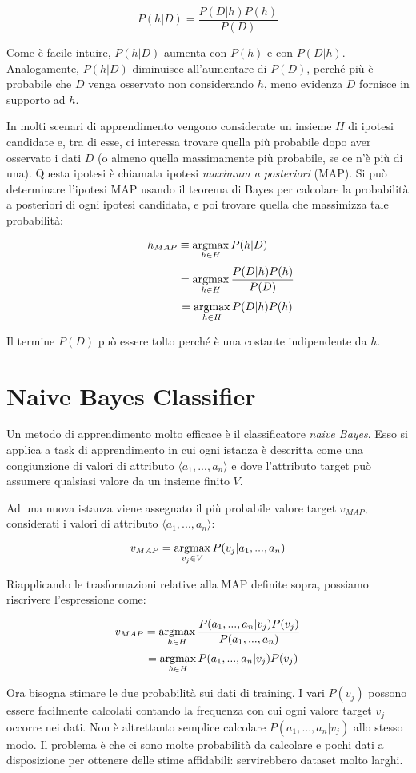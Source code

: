 $$ P(h|D) = \frac{P(D|h) P(h)}{P(D)} $$

Come è facile intuire, $P(h|D)$ aumenta con $P(h)$ e con $P(D|h)$. Analogamente, $P(h|D)$ diminuisce all'aumentare di $P(D)$, perché più è probabile che $D$ venga osservato non considerando $h$, meno evidenza $D$ fornisce in supporto ad $h$.

In molti scenari di apprendimento vengono considerate un insieme $H$ di ipotesi candidate e, tra di esse, ci interessa trovare quella più probabile dopo aver osservato i dati $D$ (o almeno quella massimamente più probabile, se ce n'è più di una). Questa ipotesi è chiamata ipotesi \emph{maximum a posteriori} (MAP). Si può determinare l'ipotesi MAP usando il teorema di Bayes per calcolare la probabilità a posteriori di ogni ipotesi candidata, e poi trovare quella che massimizza tale probabilità:

$$h_{MAP} \equiv \operatorname*{argmax}_{h \in H} P(h|D) $$
$$\hphantom{1111111111} = \operatorname*{argmax}_{h \in H} \frac{P(D|h) P(h)}{P(D)} $$
$$\hphantom{1111111111} = \operatorname*{argmax}_{h \in H} P(D|h) P(h) $$

\noindent
Il termine $P(D)$ può essere tolto perché è una costante indipendente da $h$.

\section{Naive Bayes Classifier}
Un metodo di apprendimento molto efficace è il classificatore \emph{naive Bayes}. Esso si applica a task di apprendimento in cui ogni istanza è descritta come una congiunzione di valori di attributo $\langle a_1, ..., a_n \rangle$ e dove l'attributo target può assumere qualsiasi valore da un insieme finito $V$.

Ad una nuova istanza viene assegnato il più probabile valore target $v_{MAP}$, considerati i valori di attributo $\langle a_1, ..., a_n \rangle$:

$$ v_{MAP} = \operatorname*{argmax}_{v_j \in V} P(v_j | a_1, ..., a_n) $$

Riapplicando le trasformazioni relative alla MAP definite sopra, possiamo riscrivere l'espressione come:

$$v_{MAP} = \operatorname*{argmax}_{h \in H} \frac{P(a_1, ..., a_n | v_j) P(v_j)}{P(a_1, ..., a_n)} $$
$$\hphantom{11111} = \operatorname*{argmax}_{h \in H} P(a_1, ..., a_n | v_j) P(v_j) $$

Ora bisogna stimare le due probabilità sui dati di training. I vari $P(v_j)$ possono essere facilmente calcolati contando la frequenza con cui ogni valore target $v_j$ occorre nei dati. Non è altrettanto semplice calcolare $P(a_1, ..., a_n | v_j)$ allo stesso modo. Il problema è che ci sono molte probabilità da calcolare e pochi dati a disposizione per ottenere delle stime affidabili: servirebbero dataset molto larghi.

